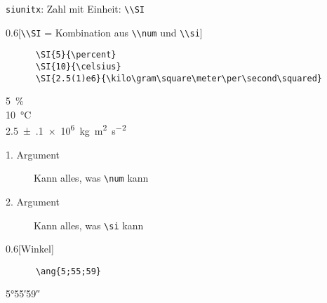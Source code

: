 \begin{frame}[fragile]{\texttt{siunitx}: Zahl mit Einheit: \lstinline+\\SI+}
  \begin{CodeExample}{0.6}[\lstinline+\\SI+ {=} Kombination aus \lstinline+\\num+ und \lstinline+\\si+]
    \begin{lstlisting}
      \SI{5}{\percent}
      \SI{10}{\celsius}
      \SI{2.5(1)e6}{\kilo\gram\square\meter\per\second\squared}
    \end{lstlisting}
  \CodeResult
    \strut
    \SI{5}{\percent} \\
    \SI{10}{\celsius} \\
    \SI{2.5(1)e6}{\kilo\gram\square\meter\per\second\squared}
  \end{CodeExample}
  \begin{description}
    \item[1. Argument] Kann alles, was \lstinline+\num+ kann
    \item[2. Argument] Kann alles, was \lstinline+\si+ kann
  \end{description}
  \begin{CodeExample}{0.6}[Winkel]
    \begin{lstlisting}
      \ang{5;55;59}
    \end{lstlisting}
  \CodeResult
    \strut
    \ang{5;55;59}
  \end{CodeExample}
\end{frame}
